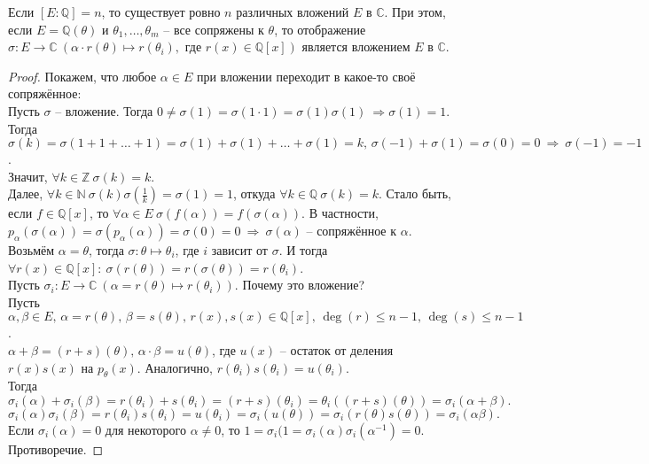 \begin{theorem} \label{l12_th6}
	Если $[E \colon \mathbb{Q}] = n$, то существует ровно $n$ различных вложений $E$ в $\mathbb{C}$. 
	При этом, если $E = \mathbb{Q}(\theta)$ и $\theta_1, \dots, \theta_m$ -- все сопряжены к $\theta$, то отображение $\sigma \colon E \to \mathbb{C} \ (\alpha \cdot r(\theta) \mapsto r(\theta_i), \text{ где } r(x)\in\mathbb{Q}[x])$ является вложением $E$ в $\mathbb{C}$.
\end{theorem}
\begin{proof}
	Покажем, что любое $\alpha \in E$ при вложении переходит в какое-то своё сопряжённое:\\
	Пусть $\sigma$ -- вложение. Тогда $0 \ne \sigma(1) = \sigma(1 \cdot 1) = \sigma(1)\sigma(1) \ \Rightarrow \sigma(1)=1$.\\
	Тогда $\sigma(k) = \sigma(1+1+\dots+1) = \sigma(1)+\sigma(1)+\dots+\sigma(1) = k, \, \sigma(-1)+\sigma(1)=\sigma(0)=0 \ \Rightarrow \ \sigma(-1)=-1$.\\
	Значит, $\forall k \in \mathbb{Z} \ \sigma(k)=k$.\\
	Далее, $\forall k \in \mathbb{N} \ \sigma(k)\sigma\left(\frac{1}{k}\right) = \sigma(1) = 1$, откуда $\forall k \in \mathbb{Q} \ \sigma(k)=k$. Стало быть, если $f \in \mathbb{Q}[x]$, то $\forall \alpha \in E \ \sigma(f(\alpha)) = f(\sigma(\alpha))$. В частности, $p_\alpha(\sigma(\alpha)) = \sigma(p_\alpha(\alpha)) = \sigma(0) = 0 \ \Rightarrow \ \sigma(\alpha)$ -- сопряжённое к $\alpha$.\\
	Возьмём $\alpha = \theta$, тогда $\sigma \colon \theta \mapsto \theta_i$, где $i$ зависит от $\sigma$. И тогда $\forall r(x) \in \mathbb{Q}[x]: \ \sigma(r(\theta)) = r(\sigma(\theta)) = r(\theta_i)$.\\
	Пусть $\sigma_i\colon E \to \mathbb{C} \ (\alpha = r(\theta) \mapsto r(\theta_i))$. Почему это вложение?\\
	Пусть $\alpha, \beta \in E, \, \alpha = r(\theta), \, \beta = s(\theta), \, r(x), s(x) \in \mathbb{Q}[x], \, \deg(r) \leq n-1, \, \deg(s) \leq n-1$.\\
	$\alpha + \beta = (r+s)(\theta), \, \alpha \cdot \beta = u(\theta)$, где $u(x)$ -- остаток от деления $r(x)s(x)$ на $p_\theta(x)$. Аналогично, $r(\theta_i)s(\theta_i) = u(\theta_i)$.\\
	Тогда
	$$\sigma_i(\alpha)+\sigma_i(\beta) = r(\theta_i)+s(\theta_i) = (r+s)(\theta_i) = \theta_i((r+s)(\theta)) = \sigma_i(\alpha+\beta).$$
	$$\sigma_i(\alpha)\sigma_i(\beta) = r(\theta_i)s(\theta_i) = u(\theta_i) = \sigma_i(u(\theta)) = \sigma_i(r(\theta)s(\theta)) = \sigma_i(\alpha\beta).$$
	Если $\sigma_i(\alpha) = 0$ для некоторого $\alpha \ne 0$, то $1=\sigma_i(1 =\sigma_i(\alpha)\sigma_i(\alpha^{-1})=0$.
	Противоречие.
\end{proof}

